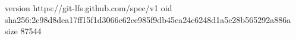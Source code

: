 version https://git-lfs.github.com/spec/v1
oid sha256:2c98d8dea17ff15f1d3066c62ce985f9db45ea24c6248d1a5c28b565292a886a
size 87544
